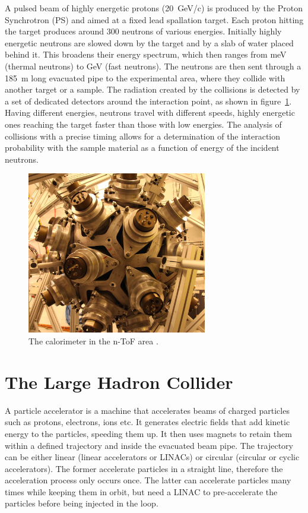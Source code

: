 \begin{description}
A pulsed beam of highly energetic protons (20~GeV/c) is produced by the Proton Synchrotron (PS) and aimed at a fixed lead spallation target. Each proton hitting the target produces around 300 neutrons of various energies. Initially highly energetic neutrons are slowed down by the target and by a slab of water placed behind it. This broadens their energy spectrum, which then ranges from meV (thermal neutrons) to GeV (fast neutrons). The neutrons are then sent through a 185~m long evacuated pipe to the experimental area, where they collide with another target or a sample. The radiation created by the collisions is detected by a set of dedicated detectors around the interaction point, as shown in figure~\ref{fig:ntof}. Having different energies, neutrons travel with different speeds, highly energetic ones reaching the target faster than those with low energies. The analysis of collisions with a precise timing allows for a determination of the interaction probability with the sample material as a function of energy of the incident neutrons.
\begin{figure}[!t]
\centering
\includegraphics[width=0.7\textwidth]{01_introduction/pics/ntof}
\caption{The calorimeter in the n-ToF area \cite{Maximilien:1304589}.}
\label{fig:ntof}
\end{figure}
\end{description}





\section{The Large Hadron Collider}
\label{subsec:lhc}
A particle accelerator is a machine that accelerates beams of charged particles such as protons, electrons, ions etc. It generates electric fields that add kinetic energy to the particles, speeding them up. It then uses magnets to retain them within a defined trajectory and inside the evacuated beam pipe. The trajectory can be either linear (linear accelerators or LINACs) or circular (circular or cyclic accelerators). The former accelerate particles in a straight line, therefore the acceleration process only occurs once. The latter can accelerate particles many times while keeping them in orbit, but need a LINAC to pre-accelerate the particles before being injected in the loop.

